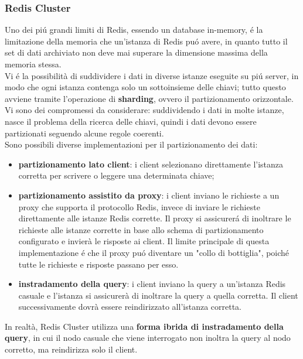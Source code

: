 \subsubsection{Redis Cluster}
Uno dei piú grandi limiti di Redis, essendo un database in-memory, é la limitazione della memoria che un'istanza di Redis puó avere, in quanto
tutto il set di dati archiviato non deve mai superare la dimensione massima della memoria stessa.
\\
Vi é la possibilità di suddividere i dati in diverse istanze eseguite su piú server, in modo che ogni
istanza contenga solo un sottoinsieme delle chiavi; tutto questo avviene tramite l'operazione di
\textbf{sharding}, ovvero il partizionamento orizzontale.
\\
Vi sono dei compromessi da considerare: suddividendo i dati in molte istanze, nasce il problema della
ricerca delle chiavi, quindi i dati devono essere partizionati seguendo alcune regole coerenti.\\
Sono possibili diverse implementazioni per il partizionamento dei dati:
\begin{itemize}
    \item \textbf{partizionamento lato client}: i client selezionano direttamente l'istanza corretta per
    scrivere o leggere una determinata chiave;
    \item \textbf{partizionamento assistito da proxy}: i client inviano le richieste a un proxy che supporta il protocollo Redis,
    invece di inviare le richieste direttamente alle istanze Redis corrette. Il proxy si assicurerá di inoltrare le richieste
    alle istanze corrette in base allo schema di partizionamento configurato e invierà le risposte ai client.
    Il limite principale di questa implementazione é che il proxy puó diventare un "collo di bottiglia", poiché
    tutte le richieste e risposte passano per esso.
    \item \textbf{instradamento della query}: i client inviano la query a un'istanza Redis casuale e l'istanza si
    assicurerà di inoltrare la query a quella corretta.
    Il client successivamente dovrà essere reindirizzato all'istanza corretta.
\end{itemize}
In realtà, Redis Cluster utilizza una \textbf{forma ibrida di instradamento della query}, in cui il nodo casuale che viene interrogato
non inoltra la query al nodo corretto, ma reindirizza solo il client.\\


